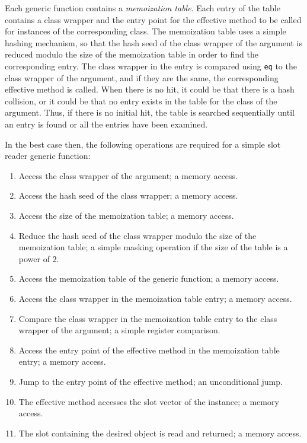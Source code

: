 Each generic function contains a \emph{memoization table}.  Each entry
of the table contains a class wrapper and the entry point for the
effective method to be called for instances of the corresponding
class.  The memoization table uses a simple hashing mechanism, so that
the hash seed of the class wrapper of the argument is reduced modulo
the size of the memoization table in order to find the corresponding
entry.  The class wrapper in the entry is compared using \texttt{eq}
to the class wrapper of the argument, and if they are the same, the
corresponding effective method is called.  When there is no hit, it
could be that there is a hash collision, or it could be that no entry
exists in the table for the class of the argument.  Thus, if there is
no initial hit, the table is searched sequentially until an entry is
found or all the entries have been examined. 

In the best case then, the following operations are required for a
simple slot reader generic function:

\begin{enumerate}
\item Access the class wrapper of the argument; a memory access.
\item Access the hash seed of the class wrapper; a memory access.
\item Access the size of the memoization table; a memory access.
\item Reduce the hash seed of the class wrapper modulo the size of the
  memoization table; a simple masking operation if the size of the
  table is a power of $2$.
\item Access the memoization table of the generic function; a memory
  access.
\item Access the class wrapper in the memoization table entry; a
  memory access.
\item Compare the class wrapper in the memoization table entry to the
  class wrapper of the argument; a simple register comparison.
\item Access the entry point of the effective method in the
  memoization table entry; a memory access.
\item Jump to the entry point of the effective method; an
  unconditional jump.
\item The effective method accesses the slot vector of the instance; a
  memory access.
\item The slot containing the desired object is read and returned; a
  memory access.
\end{enumerate}

